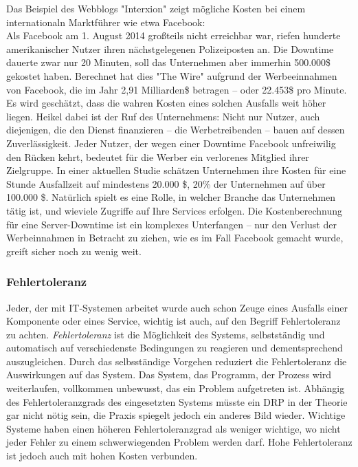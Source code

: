 \documentclass[letterpaper, 12pt]{article}
\let\tempsubsubsection\subsubsection
\renewcommand\subsubsection[1]{\vspace{0cm}\tempsubsubsection{#1}\vspace{0cm}}
\begin{document}
Das Beispiel des Webblogs "Interxion" zeigt mögliche Kosten bei einem internationaln Marktführer wie etwa Facebook: \\
Als Facebook am 1. August 2014 großteils nicht erreichbar war, riefen hunderte amerikanischer Nutzer ihren nächstgelegenen Polizeiposten an. Die Downtime dauerte zwar nur 20 Minuten, soll das Unternehmen aber immerhin 500.000\$ gekostet haben. Berechnet hat dies "The Wire" aufgrund der Werbeeinnahmen von Facebook, die im Jahr 2,91 Milliarden\$ betragen – oder 22.453\$ pro Minute. Es wird geschätzt, dass die wahren Kosten eines solchen Ausfalls weit höher liegen. Heikel dabei ist der Ruf des Unternehmens: Nicht nur Nutzer, auch diejenigen, die den Dienst finanzieren – die Werbetreibenden – bauen auf dessen Zuverlässigkeit. Jeder Nutzer, der wegen einer Downtime Facebook unfreiwilig den Rücken kehrt, bedeutet für die Werber ein verlorenes Mitglied ihrer Zielgruppe. In einer aktuellen Studie schätzen Unternehmen ihre Kosten für eine Stunde Ausfallzeit auf mindestens 20.000 \$, 20\% der Unternehmen auf über 100.000 \$. Natürlich spielt es eine Rolle, in welcher Branche das Unternehmen tätig ist, und wieviele Zugriffe auf Ihre Services erfolgen. Die Kostenberechnung für eine Server-Downtime ist ein komplexes Unterfangen –  nur den Verlust der Werbeinnahmen in Betracht zu ziehen, wie es im Fall Facebook gemacht wurde, greift sicher noch zu wenig weit.

\subsubsection{Fehlertoleranz}

Jeder, der mit IT-Systemen arbeitet wurde auch schon Zeuge eines Ausfalls einer Komponente oder eines Service, wichtig ist auch, auf den Begriff Fehlertoleranz zu achten. \textit{Fehlertoleranz} ist die Möglichkeit des Systems, selbstständig und automatisch auf verschiedenste Bedingungen zu reagieren und dementsprechend auszugleichen. Durch das selbsständige Vorgehen reduziert die Fehlertoleranz die Auswirkungen auf das System. Das System, das Programm, der Prozess wird weiterlaufen, vollkommen unbewusst, das ein Problem aufgetreten ist. Abhängig des Fehlertoleranzgrads des eingesetzten Systems müsste ein DRP in der Theorie gar nicht nötig sein, die Praxis spiegelt jedoch ein anderes Bild wieder. Wichtige Systeme haben einen höheren Fehlertoleranzgrad als weniger wichtige, wo nicht jeder Fehler zu einem schwerwiegenden Problem werden darf. Hohe Fehlertoleranz ist jedoch auch mit hohen Kosten verbunden.
\end{document}
